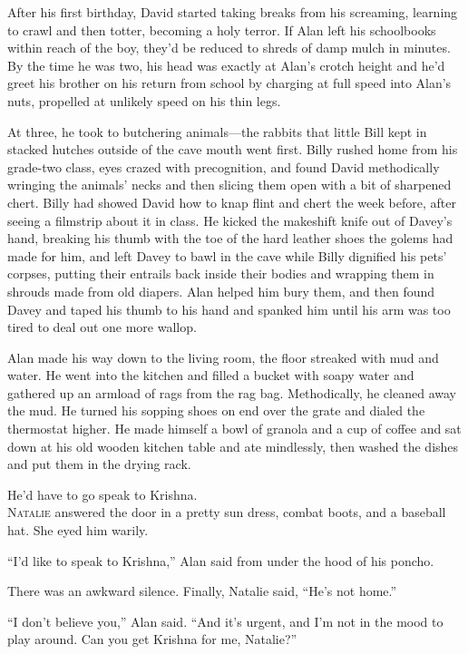 After his first birthday, David started taking breaks from his
screaming, learning to crawl and then totter, becoming a holy terror. 
If Alan left his schoolbooks within reach of the boy, they'd be
reduced to shreds of damp mulch in minutes.  By the time he was two,
his head was exactly at Alan's crotch height and he'd greet his
brother on his return from school by charging at full speed into
Alan's nuts, propelled at unlikely speed on his thin legs.

At three, he took to butchering animals---the rabbits that little Bill
kept in stacked hutches outside of the cave mouth went first.  Billy
rushed home from his grade-two class, eyes crazed with precognition,
and found David methodically wringing the animals' necks and then
slicing them open with a bit of sharpened chert.  Billy had showed
David how to knap flint and chert the week before, after seeing a
filmstrip about it in class.  He kicked the makeshift knife out of
Davey's hand, breaking his thumb with the toe of the hard leather
shoes the golems had made for him, and left Davey to bawl in the cave
while Billy dignified his pets' corpses, putting their entrails back
inside their bodies and wrapping them in shrouds made from old
diapers.  Alan helped him bury them, and then found Davey and taped
his thumb to his hand and spanked him until his arm was too tired to
deal out one more wallop.

Alan made his way down to the living room, the floor streaked with mud
and water.  He went into the kitchen and filled a bucket with soapy
water and gathered up an armload of rags from the rag bag. 
Methodically, he cleaned away the mud.  He turned his sopping shoes on
end over the grate and dialed the thermostat higher.  He made himself
a bowl of granola and a cup of coffee and sat down at his old wooden
kitchen table and ate mindlessly, then washed the dishes and put them
in the drying rack.

He'd have to go speak to Krishna.
\\
\lettrine[lines=3, lhang=.5, nindent=0pt, findent=2pt]{N}{atalie} answered the door in a pretty sun dress, combat boots, and a
baseball hat.  She eyed him warily.

``I'd like to speak to Krishna,'' Alan said from under the hood of his
poncho.

There was an awkward silence.  Finally, Natalie said, ``He's not
home.''

``I don't believe you,'' Alan said.  ``And it's urgent, and I'm not in
the mood to play around.  Can you get Krishna for me, Natalie?''

